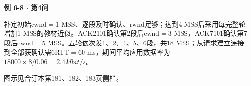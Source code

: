 {\color{ink}\bfseries 例 6-8 \(\cdot \) 第4问}\par\vspace{1bp}补定初始cwnd\(=\allowbreak{}\)1 MSS、逐段及时确认、rwnd足够；达到4 MSS后采用每完整轮增加1 MSS的教材近似。ACK2101确认第2段后cwnd\(=\allowbreak{}\)3 MSS，ACK7101确认第7段后cwnd\(=\allowbreak{}\)5 MSS。五轮依次发1、2、4、5、6段，共18 MSS；从请求建立连接到全部获确认需6RTT\(=\allowbreak{}\)60 ms，期间平均应用数据率为\(18000\times 8/\allowbreak{}0.06=\allowbreak{}2.4 Mbit/\allowbreak{}s\)。\par {\color{ink}图示见合订本第181、182、183页侧栏。}
